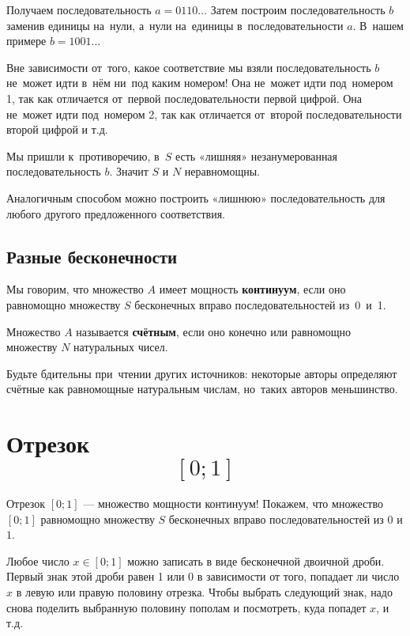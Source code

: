 \documentclass[10pt,a4paper]{article}
\begin{document}
Получаем последовательность $a=0110\ldots$ Затем построим последовательность $b$ заменив единицы на~нули, а~нули на~единицы в~последовательности $a$. В~нашем примере $b=1001\ldots $

Вне зависимости от~того, какое соответствие мы взяли  последовательность $b$ не~может идти в~нём ни~под каким номером! Она не~может идти под~номером 1, так как отличается от~первой последовательности первой цифрой. Она не~может идти под~номером 2, так как отличается от~второй последовательности второй цифрой и т.д.

Мы пришли к~противоречию, в~$S$ есть «лишняя» незанумерованная последовательность $b$. Значит $S$ и $N$ неравномощны.

Аналогичным способом можно построить «лишнюю» последовательность для любого другого предложенного соответствия.

\subsection{Разные бесконечности}

Мы говорим, что множество $A$ имеет мощность \textbf{континуум}, если оно равномощно множеству $S$ бесконечных вправо последовательностей из~0~и~1.


Множество $A$ называется \textbf{счётным}, если оно конечно или равномощно множеству $N$ натуральных чисел.

Будьте бдительны при~чтении других источников: некоторые авторы определяют счётные как равномощные натуральным числам, но~таких авторов меньшинство.

\section{Отрезок \[ [0;1] \]}

Отрезок $[0;1]$ --- множество мощности континуум!
Покажем, что множество $[0;1]$ равномощно множеству $S$ бесконечных вправо последовательностей из $0$ и $1$.

Любое число $x \in [0;1]$ можно записать в виде бесконечной двоичной дроби. Первый знак этой дроби равен 1 или 0 в зависимости от того, попадает ли число $x$ в левую или правую половину отрезка. Чтобы выбрать следующий знак, надо снова поделить выбранную половину пополам и посмотреть, куда попадет $x$, и т.д.
\end{document}
